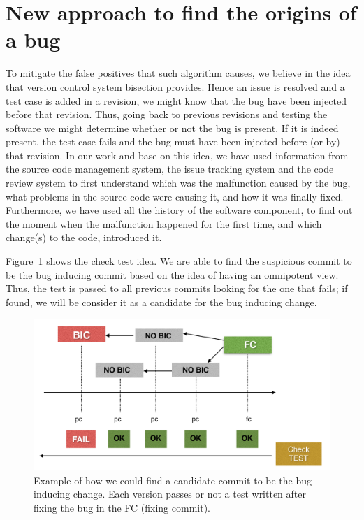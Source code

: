 \documentclass[a4paper]{article}
\begin{document}
\section{New approach to find the origins of a bug}

To mitigate the false positives that such algorithm causes, we believe in the idea that version control system bisection provides. Hence an issue is resolved and a test case is added in a revision, we might know that the bug have been injected before that revision. Thus, going back to previous revisions and testing the software we might determine whether or not the bug is present. If it is indeed present, the test case fails and the bug must have been injected before (or by) that revision. In our work and base on this idea, we have used information from the source code management system, the issue tracking system and the code review system to first understand which was the malfunction caused by the bug, what problems in the source code were causing it, and how it was finally fixed. Furthermore, we have used all the history of the software component, to find out the moment when the malfunction happened for the first time, and which change(s) to the code, introduced it. 

Figure~\ref{fig:test} shows the check test idea. We are able to find the suspicious commit to be the bug inducing commit based on the idea of having an omnipotent view. Thus, the test is passed to all previous commits looking for the one that fails; if found, we will be consider it as a candidate for the bug inducing change.

\begin{figure}[ht]
\centering
\includegraphics[width=\columnwidth]{testrecursive.png}
\caption{Example of how we could find a candidate commit to be the  bug inducing change. Each version passes or not a test written after fixing the bug in the FC (fixing commit).}
\label{fig:test}      
\end{figure}
\end{document}
